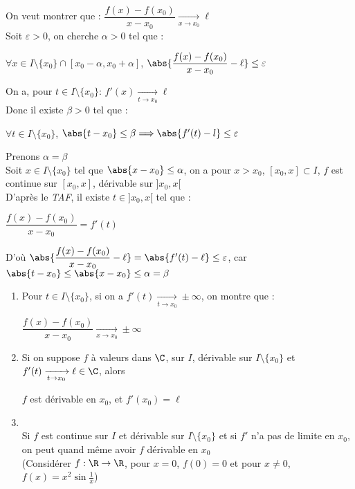\documentclass[12pt,a4paper]{report}
\begin{document}
\begin{demo}
On veut montrer que : $\dfrac{f(x)-f(x_0)}{x-x_0}\xrightarrow[x\to x_0]{} \ell$\\
Soit $\varepsilon >0$, on cherche $\alpha >0$ tel que :
\begin{center}
    $\forall x \in I\setminus\lbrace x_0 \rbrace \cap [x_0 - \alpha, x_0 + \alpha]$, $\abs{\dfrac{f(x)-f(x_0)}{x-x_0} - \ell}\leq \varepsilon$
\end{center}
On a, pour $t \in I\setminus\lbrace x_0 \rbrace$: $f'(x) \xrightarrow[t \to x_0]{} \ell$\\
Donc il existe $\beta >0$ tel que :
\begin{center}
    $\forall t \in I\setminus\lbrace x_0 \rbrace$, $\abs{t-x_0}\leq \beta \Longrightarrow \abs{f'(t)-l}\leq \varepsilon$
\end{center}
Prenons $\alpha=\beta$\\
Soit $x\in I\setminus\lbrace x_0 \rbrace$ tel que $\abs{x-x_0}\leq \alpha$, on a pour $x>x_0$, $[x_0,x]\subset I$, $f$ est continue sur $[x_0,x]$, dérivable sur $]x_0,x[$\\
D'après le \textit{TAF}, il existe $t \in ]x_0,x[$ tel que : 
\begin{center}
    $\dfrac{f(x)-f(x_0)}{x-x_0} = f'(t)$
\end{center}
D'où $\abs{\dfrac{f(x)-f(x_0)}{x-x_0} - \ell}=\abs{f'(t)-\ell}\leq \varepsilon$, car $\abs{t-x_0} \leq \abs{x-x_0} \leq \alpha=\beta$
\end{demo}

\begin{remarque}
\begin{enumerate}
    \item Pour $t\in I\setminus \lbrace x_0 \rbrace$, si on a $f'(t) \xrightarrow[t\to x_0]{} \pm \infty$, on montre que :
    \begin{center}
        $\dfrac{f(x)-f(x_0)}{x-x_0} \xrightarrow[x \to x_0]{} \pm \infty$
    \end{center}
    \item Si on suppose $f$ à valeurs dans $\C$, sur $I$, dérivable sur $I\setminus \lbrace x_0 \rbrace$ et $f'(t)\xrightarrow[t \to x_0]{} \ell \in \C$, alors 
    \begin{center}
        $f$ est dérivable en $x_0$, et $f'(x_0)=\ell$
    \end{center}
    \item {} \\
    Si $f$ est continue sur $I$ et dérivable sur $I\setminus\lbrace x_0 \rbrace$ et si $f'$ n'a pas de limite en $x_0$, on peut quand même avoir $f$ dérivable en $x_0$\\
    (Considérer $f:\R \to \R$, pour $x=0$, $f(0)=0$ et pour $x\neq0$, $f(x)=x^2 \sin \frac{1}{x}$)
\end{enumerate}
\end{remarque}
\end{document}
